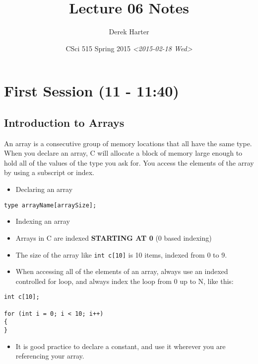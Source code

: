 \documentclass[11pt]{article}
\author{Derek Harter}
\date{CSci 515 Spring 2015 \textit{<2015-02-18 Wed>}}
\title{Lecture 06 Notes}
\begin{document}
\maketitle

\section{First Session (11 - 11:40)}
\label{sec-1}
\subsection{Introduction to Arrays}
\label{sec-1-1}
An array is a consecutive group of memory locations that all have the
same type.  When you declare an array, C will allocate a block of memory
large enough to hold all of the values of the type you ask for.  You access
the elements of the array by using a subscript or index.

\begin{itemize}
\item Declaring an array
\end{itemize}

\begin{verbatim}
type arrayName[arraySize];
\end{verbatim}

\begin{itemize}
\item Indexing an array
\item Arrays in C are indexed \textbf{STARTING AT 0} (0 based indexing)
\item The size of the array like \verb~int c[10]~ is 10 items, indexed from 0 to 9.
\item When accessing all of the elements of an array, always use an indexed
controlled for loop, and always index the loop from 0 up to N, like this:
\end{itemize}

\begin{verbatim}
int c[10];

for (int i = 0; i < 10; i++)
{
}
\end{verbatim}

\begin{itemize}
\item It is good practice to declare a constant, and use it wherever you are
referencing your array.
\end{itemize}
\end{document}
